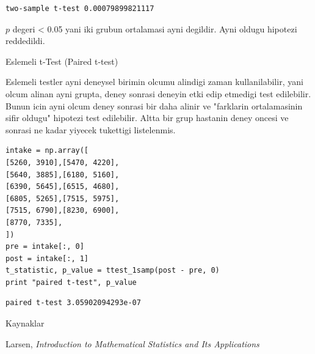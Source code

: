 \documentclass[12pt,fleqn]{article}\usepackage{../common}
\begin{document}
\begin{verbatim}
two-sample t-test 0.00079899821117
\end{verbatim}

$p$ degeri < 0.05 yani iki grubun ortalamasi ayni degildir. Ayni oldugu
hipotezi reddedildi.

Eslemeli t-Test (Paired t-test)

Eslemeli testler ayni deneysel birimin olcumu alindigi zaman
kullanilabilir, yani olcum alinan ayni grupta, deney sonrasi deneyin
etki edip etmedigi test edilebilir. Bunun icin ayni olcum deney
sonrasi bir daha alinir ve "farklarin ortalamasinin sifir oldugu"
hipotezi test edilebilir. Altta bir grup hastanin deney oncesi ve
sonrasi ne kadar yiyecek tukettigi listelenmis. 

\begin{verbatim}
intake = np.array([
[5260, 3910],[5470, 4220],
[5640, 3885],[6180, 5160],
[6390, 5645],[6515, 4680],
[6805, 5265],[7515, 5975],
[7515, 6790],[8230, 6900],
[8770, 7335],
])
pre = intake[:, 0]
post = intake[:, 1]
t_statistic, p_value = ttest_1samp(post - pre, 0)
print "paired t-test", p_value
\end{verbatim}

\begin{verbatim}
paired t-test 3.05902094293e-07
\end{verbatim}

Kaynaklar

Larsen, {\em Introduction to Mathematical Statistics and Its Applications}
\end{document}
